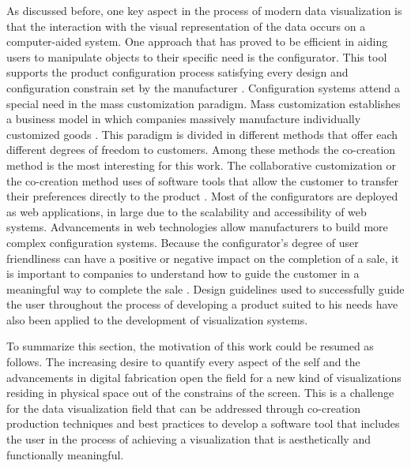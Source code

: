 \documentclass[../medieninformatik-arbeit.tex]{subfiles}
\begin{document}
As discussed before, one key aspect in the process of modern data visualization
is that the interaction with the visual representation of the data occurs on a
computer-aided system. One approach that has proved to be efficient in aiding
users to manipulate objects to their specific need is the configurator. This
tool supports the product configuration process satisfying every design and
configuration constrain set by the manufacturer \cite{hedin1998product}. 
Configuration systems attend a special need in the mass customization
paradigm. Mass customization establishes a business model in which companies
massively manufacture individually customized 
goods \cite{felfernig2014knowledge}.
This paradigm is divided in different methods that offer each different degrees
of freedom to customers. Among these methods the co-creation method is the most interesting for this work. The
collaborative customization or the co-creation method uses of software
tools that allow the customer to transfer their preferences directly to the
product \cite{pine1999mass,piller2006user}. Most of the configurators are
deployed as web applications, in large due to the scalability and accessibility
of web systems. Advancements in web technologies allow manufacturers to build
more complex configuration systems. 
Because the configurator's degree of user friendliness can have a positive or
negative impact on the completion of a sale, it is important to companies to
understand how to guide the customer in a meaningful way to complete the
sale \cite{rolland2012commerce,abbasi2012s}. Design guidelines used to successfully guide the user throughout the process of developing a product suited to his needs \cite{Konstanzer20078609220,abbasi2012s} have also been applied to the development of visualization systems. 

To summarize this section, the motivation of this work could be resumed as
follows. The increasing desire to quantify every aspect of the self and the advancements in digital 
fabrication open the field for a new kind of visualizations residing 
in physical space out of the constrains of the screen. This is a challenge for
the data visualization field that can be addressed through co-creation production techniques and best
practices to develop a software tool that includes the user in
the process of achieving a visualization
that is aesthetically and functionally meaningful. 
\end{document}

